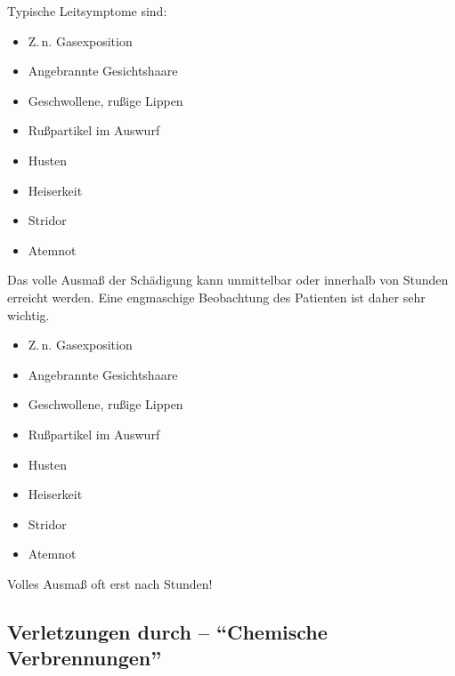{%
%
Typische Leitsymptome sind:
\begin{itemize}
  \item Z.\,n. Gasexposition
  \item Angebrannte Gesichtshaare
  \item Geschwollene, rußige Lippen
  \item Rußpartikel im Auswurf
  \item Husten
  \item Heiserkeit
  \item Stridor
  \item Atemnot
\end{itemize}
Das volle Ausmaß der Schädigung kann unmittelbar oder
innerhalb von Stunden erreicht werden. Eine engmaschige
Beobachtung des Patienten ist daher sehr wichtig.
}
{%
\begin{itemize}
  \item Z.\,n. Gasexposition
  \item Angebrannte Gesichtshaare
  \item Geschwollene, rußige Lippen
  \item Rußpartikel im Auswurf
  \item Husten
  \item Heiserkeit
  \item Stridor
  \item Atemnot
\end{itemize}

Volles Ausmaß oft erst nach Stunden!
}














\clearpage
\subsection{Verletzungen durch  -- \enquote{Chemische Verbrennungen}}
\label{topic:veraetzung-trauma}%



